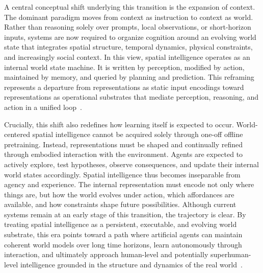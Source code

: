 A central conceptual shift underlying this transition is the expansion of context.
The dominant paradigm moves from context as instruction to context as world.
Rather than reasoning solely over prompts, local observations, or short-horizon inputs, systems are now required to organize cognition around an evolving world state that integrates spatial structure, temporal dynamics, physical constraints, and increasingly social context.
In this view, spatial intelligence operates as an internal world state machine.
It is written by perception, modified by action, maintained by memory, and queried by planning and prediction.
This reframing represents a departure from representations as static input encodings toward representations as operational substrates that mediate perception, reasoning, and action in a unified loop~\cite{genie3,driess2023palm}.


Crucially, this shift also redefines how learning itself is expected to occur.
World-centered spatial intelligence cannot be acquired solely through one-off offline pretraining.
Instead, representations must be shaped and continually refined through embodied interaction with the environment.
Agents are expected to actively explore, test hypotheses, observe consequences, and update their internal world states accordingly.
Spatial intelligence thus becomes inseparable from agency and experience.
The internal representation must encode not only where things are, but how the world evolves under action, which affordances are available, and how constraints shape future possibilities.
Although current systems remain at an early stage of this transition, the trajectory is clear.
By treating spatial intelligence as a persistent, executable, and evolving world substrate, this era points toward a path where artificial agents can maintain coherent world models over long time horizons, learn autonomously through interaction, and ultimately approach human-level and potentially superhuman-level intelligence grounded in the structure and dynamics of the real world~\cite{wang2023voyager,ali2025world,wang2023robogen}.






